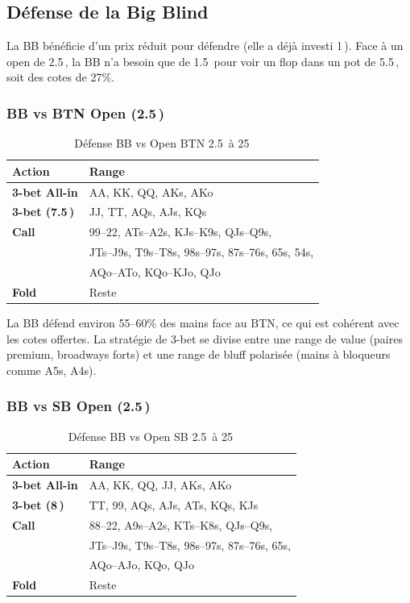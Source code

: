 \documentclass[a4paper,11pt]{article}
\newcommand{\bb}{\,\mathrm{bb}}
\begin{document}
\subsection{D\'efense de la Big Blind}

La BB b\'en\'eficie d'un prix r\'eduit pour d\'efendre (elle a d\'ej\`a investi 1\bb). Face \`a un open de 2.5\bb, la BB n'a besoin que de 1.5\bb{} pour voir un flop dans un pot de 5.5\bb, soit des cotes de 27\%.

\subsubsection{BB vs BTN Open (2.5\bb)}

\begin{table}[H]
\centering
\caption{D\'efense BB vs Open BTN 2.5\bb{} \`a 25\bb}
\label{tab:bb_vs_btn}
\small
\begin{tabular}{l l}
\toprule
\textbf{Action} & \textbf{Range} \\
\midrule
\textcolor{raise}{\textbf{3-bet All-in}} & AA, KK, QQ, AKs, AKo \\
\textcolor{raise}{\textbf{3-bet (7.5\bb)}} & JJ, TT, AQs, AJs, KQs \\
\textcolor{call}{\textbf{Call}} & 99--22, ATs--A2s, KJs--K9s, QJs--Q9s, \\
 & JTs--J9s, T9s--T8s, 98s--97s, 87s--76s, 65s, 54s, \\
 & AQo--ATo, KQo--KJo, QJo \\
\textcolor{fold}{\textbf{Fold}} & Reste \\
\bottomrule
\end{tabular}
\end{table}

La BB d\'efend environ 55--60\% des mains face au BTN, ce qui est coh\'erent avec les cotes offertes. La strat\'egie de 3-bet se divise entre une range de value (paires premium, broadways forts) et une range de bluff polaris\'ee (mains \`a bloqueurs comme A5s, A4s).

\subsubsection{BB vs SB Open (2.5\bb)}

\begin{table}[H]
\centering
\caption{D\'efense BB vs Open SB 2.5\bb{} \`a 25\bb}
\label{tab:bb_vs_sb}
\small
\begin{tabular}{l l}
\toprule
\textbf{Action} & \textbf{Range} \\
\midrule
\textcolor{raise}{\textbf{3-bet All-in}} & AA, KK, QQ, JJ, AKs, AKo \\
\textcolor{raise}{\textbf{3-bet (8\bb)}} & TT, 99, AQs, AJs, ATs, KQs, KJs \\
\textcolor{call}{\textbf{Call}} & 88--22, A9s--A2s, KTs--K8s, QJs--Q9s, \\
 & JTs--J9s, T9s--T8s, 98s--97s, 87s--76s, 65s, \\
 & AQo--AJo, KQo, QJo \\
\textcolor{fold}{\textbf{Fold}} & Reste \\
\bottomrule
\end{tabular}
\end{table}
\end{document}
